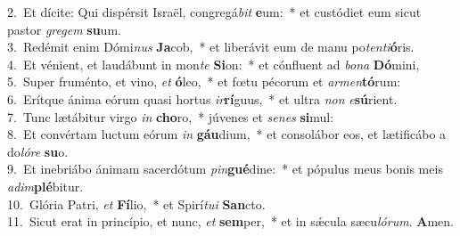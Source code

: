 {2.~}Et dícite: Qui dispérsit Israël, congregá\textit{bit} \textbf{e}um:~* et custódiet eum sicut pastor \textit{gre}\textit{gem} \textbf{su}um.\\
{3.~}Redémit enim Dómi\textit{nus} \textbf{Ja}cob,~* et liberávit eum de manu po\textit{ten}\textit{ti}\textbf{ó}ris.\\
{4.~}Et vénient, et laudábunt in mon\textit{te} \textbf{Si}on:~* et cónfluent ad \textit{bo}\textit{na} \textbf{Dó}mini,\\
{5.~}Super fruménto, et vino, \textit{et} \textbf{ó}leo,~* et fœtu pécorum et \textit{ar}\textit{men}\textbf{tó}rum:\\
{6.~}Erítque ánima eórum quasi hortus \textit{ir}\textbf{rí}guus,~* et ultra \textit{non} \textit{e}\textbf{sú}rient.\\
{7.~}Tunc lætábitur virgo \textit{in} \textbf{cho}ro,~* júvenes et \textit{se}\textit{nes} \textbf{si}mul:\\
{8.~}Et convértam luctum eórum \textit{in} \textbf{gáu}dium,~* et consolábor eos, et lætificábo a do\textit{ló}\textit{re} \textbf{su}o.\\
{9.~}Et inebriábo ánimam sacerdótum \textit{pin}\textbf{gué}dine:~* et pópulus meus bonis meis \textit{a}\textit{dim}\textbf{plé}bitur.\\
{10.~}Glória Patri, \textit{et} \textbf{Fí}lio,~* et Spirí\textit{tu}\textit{i} \textbf{San}cto.\\
{11.~}Sicut erat in princípio, et nunc, \textit{et} \textbf{sem}per,~* et in sǽcula sæcu\textit{ló}\textit{rum}. \textbf{A}men.\\
